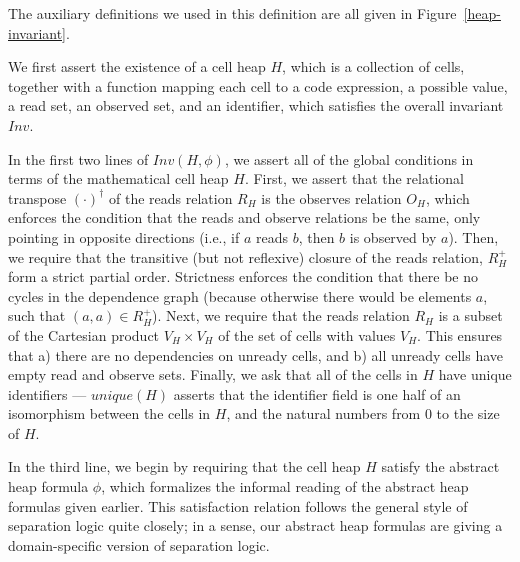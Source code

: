 
The auxiliary definitions we used in this definition are all given in
Figure~\ref{heap-invariant}. 

We first assert the existence of a cell heap $H$, which is a
collection of cells, together with a function mapping each cell to a
code expression, a possible value, a read set, an observed set, and an
identifier, which satisfies the overall invariant $Inv$.


In the first two lines of $Inv(H, \phi)$, we assert all of the global 
conditions in terms of the mathematical cell heap $H$. First, we assert that 
the relational transpose $(\cdot)^\dagger$ of the reads relation $R_H$ is the
observes relation $O_H$, which enforces the condition that the reads
and observe relations be the same, only pointing in opposite
directions (i.e., if $a$ reads $b$, then $b$ is observed by
$a$). Then, we require that the transitive (but not reflexive) closure
of the reads relation, $R^+_H$ form a strict partial order. Strictness
enforces the condition that there be no cycles in the dependence graph
(because otherwise there would be elements $a$, such that $(a, a) \in
R^+_H$).  Next, we require that the reads relation $R_H$ is a subset of
the Cartesian product $V_H \times V_H$ of the set of cells with values
$V_H$. This ensures that a) there are no dependencies on unready
cells, and b) all unready cells have empty read and observe
sets. Finally, we ask that all of the cells in $H$ have unique
identifiers --- $unique(H)$ asserts that the identifier field is one
half of an isomorphism between the cells in $H$, and the natural
numbers from 0 to the size of $H$.

In the third line, we begin by requiring that the cell heap $H$ satisfy
the abstract heap formula $\phi$, which formalizes the informal
reading of the abstract heap formulas given earlier. This satisfaction
relation follows the general style of separation logic quite closely; 
in a sense, our abstract heap formulas are giving a domain-specific
version of separation logic.

